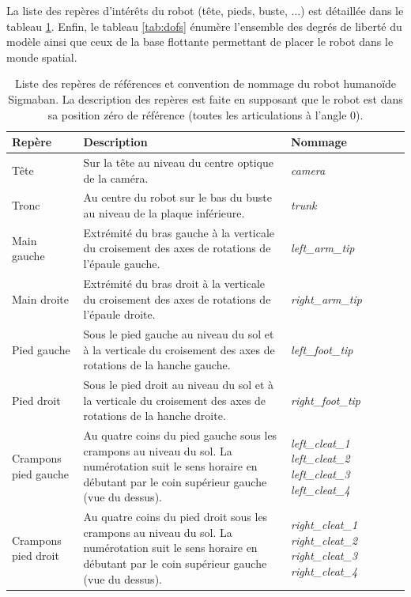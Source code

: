 La liste des repères d'intérêts du robot (tête, pieds, buste, ...) 
est détaillée dans le tableau \ref{tab:frames}.
Enfin, le tableau \ref{tab:dofs} énumère l'ensemble des degrés de liberté 
du modèle ainsi que ceux de la base flottante permettant de placer
le robot dans le monde spatial.

\begin{table}[htb]
\begin{center}
    \begin{tabular}{|l|p{5cm}|p{2.6cm}|}
        \hline
        Repère & Description & Nommage\\
        \hline
        Tête & 
            Sur la tête au niveau du centre optique de la caméra. & 
            \textit{camera} \\
        \hline
        Tronc & 
            Au centre du robot sur le bas du buste au niveau de la
            plaque inférieure. & 
            \textit{trunk} \\
        \hline
        Main gauche & 
            Extrémité du bras gauche à la verticale du croisement 
            des axes de rotations de l'épaule gauche. & 
            \textit{left\_arm\_tip} \\
        \hline
        Main droite & 
            Extrémité du bras droit à la verticale du croisement 
            des axes de rotations de l'épaule droite. & 
            \textit{right\_arm\_tip} \\
        \hline
        Pied gauche & 
            Sous le pied gauche au niveau du sol et à la verticale
            du croisement des axes de rotations de la hanche gauche. & 
            \textit{left\_foot\_tip} \\
        \hline
        Pied droit & 
            Sous le pied droit au niveau du sol et à la verticale
            du croisement des axes de rotations de la hanche droite. & 
            \textit{right\_foot\_tip} \\
        \hline
        Crampons pied gauche & 
            Au quatre coins du pied gauche sous les crampons au niveau du sol. 
            La numérotation suit le sens horaire en débutant par le coin supérieur gauche 
            (vue du dessus). &
            \textit{left\_cleat\_1} \textit{left\_cleat\_2} \textit{left\_cleat\_3} \textit{left\_cleat\_4} \\
        \hline
        Crampons pied droit & 
            Au quatre coins du pied droit sous les crampons au niveau du sol. 
            La numérotation suit le sens horaire en débutant par le coin supérieur gauche
            (vue du dessus). &
            \textit{right\_cleat\_1} \textit{right\_cleat\_2} \textit{right\_cleat\_3} \textit{right\_cleat\_4} \\
        \hline
    \end{tabular}
    \caption{\label{tab:frames}Liste des repères de références et convention de nommage
    du robot humanoïde Sigmaban.
    La description des repères est faite en supposant que le robot
    est dans sa position zéro de référence (toutes les articulations à l'angle $0$).}
\end{center}
\end{table}

